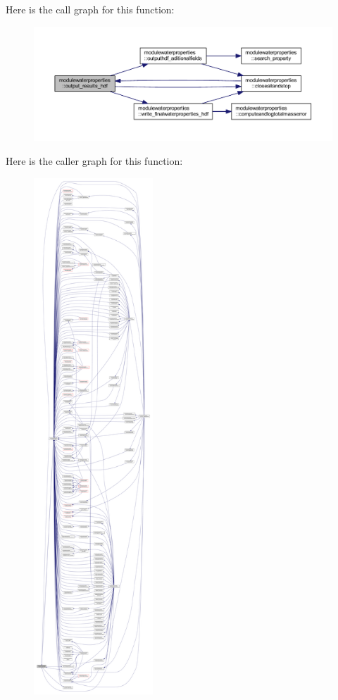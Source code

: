Here is the call graph for this function\+:\nopagebreak
\begin{figure}[H]
\begin{center}
\leavevmode
\includegraphics[width=350pt]{namespacemodulewaterproperties_aa0e5621dbf495abbff865260517a210e_cgraph}
\end{center}
\end{figure}
Here is the caller graph for this function\+:\nopagebreak
\begin{figure}[H]
\begin{center}
\leavevmode
\includegraphics[height=550pt]{namespacemodulewaterproperties_aa0e5621dbf495abbff865260517a210e_icgraph}
\end{center}
\end{figure}
\mbox{\label{namespacemodulewaterproperties_ae4782724563831422008fbeb12c51841}} 
